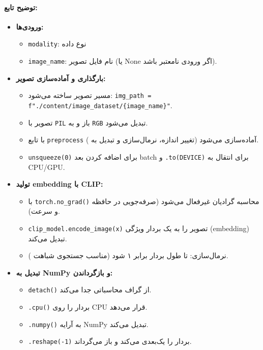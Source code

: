 \documentclass{article}
\begin{document}
\paragraph{توضیح تابع:}
\begin{itemize}
    \item \textbf{ورودی‌ها:}
    \begin{itemize}
        \item \texttt{modality}: نوع داده
        \item \texttt{image\_name}: نام فایل تصویر (یا None اگر ورودی نامعتبر باشد).
    \end{itemize}
    \item \textbf{بارگذاری و آماده‌سازی تصویر:}
    \begin{itemize}
        \item مسیر تصویر ساخته می‌شود: \texttt{img\_path = f"./content/image\_dataset/\{image\_name\}"}.
        \item تصویر با \texttt{PIL} باز و به \texttt{RGB} تبدیل می‌شود.
        \item با تابع \texttt{preprocess} آماده‌سازی می‌شود (تغییر اندازه، نرمال‌سازی و تبدیل به ).
        \item \texttt{unsqueeze(0)} برای اضافه کردن بعد batch و \texttt{.to(DEVICE)} برای انتقال به CPU/GPU.
    \end{itemize}
    \item \textbf{تولید embedding با CLIP:}
    \begin{itemize}
        \item با \texttt{torch.no\_grad()} محاسبه گرادیان غیرفعال می‌شود (صرفه‌جویی در حافظه و سرعت).
        \item \texttt{clip\_model.encode\_image(x)} تصویر را به یک بردار ویژگی (embedding) تبدیل می‌کند.
        \item نرمال‌سازی: \texttt{} تا طول بردار برابر ۱ شود (مناسب جستجوی شباهت ).
    \end{itemize}
    \item \textbf{تبدیل به NumPy و بازگرداندن:}
    \begin{itemize}
        \item \texttt{detach()} از گراف محاسباتی جدا می‌کند.
        \item \texttt{.cpu()} بردار را روی CPU قرار می‌دهد.
        \item \texttt{.numpy()} به آرایه NumPy تبدیل می‌کند.
        \item \texttt{.reshape(-1)} بردار را یک‌بعدی می‌کند و باز می‌گرداند.
    \end{itemize}
\end{itemize}
\end{document}
